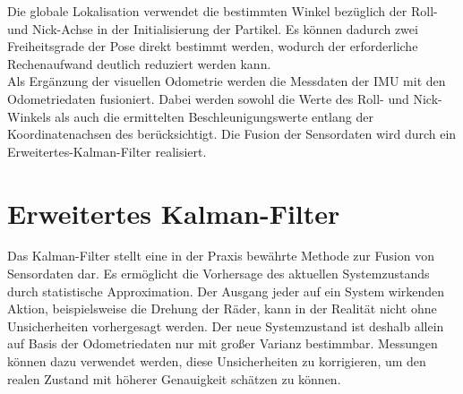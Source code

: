 Die globale Lokalisation verwendet die bestimmten Winkel bezüglich der Roll- und Nick-Achse in der Initialisierung der Partikel. Es können dadurch zwei Freiheitsgrade der Pose direkt bestimmt werden, wodurch der erforderliche Rechenaufwand deutlich reduziert werden kann.\\

Als Ergänzung der visuellen Odometrie werden die Messdaten der IMU mit den Odometriedaten fusioniert. Dabei werden sowohl die Werte des Roll- und Nick-Winkels als auch die ermittelten Beschleunigungswerte entlang der Koordinatenachsen des  berücksichtigt. Die Fusion der Sensordaten wird durch ein Erweitertes-Kalman-Filter realisiert.

\prever{
}
\section{Erweitertes Kalman-Filter}
\label{chap.kalman}
Das Kalman-Filter \cite{Kalman1960} stellt eine in der Praxis bewährte Methode zur Fusion von Sensordaten dar. Es ermöglicht die Vorhersage des aktuellen Systemzustands durch statistische Approximation. Der Ausgang jeder auf ein System wirkenden Aktion, beispielsweise die Drehung der Räder, kann in der Realität nicht ohne Unsicherheiten vorhergesagt werden. Der neue Systemzustand ist deshalb allein auf Basis der Odometriedaten nur mit großer Varianz bestimmbar. Messungen können dazu verwendet werden, diese Unsicherheiten zu korrigieren, um den realen Zustand mit höherer Genauigkeit schätzen zu können.\\

